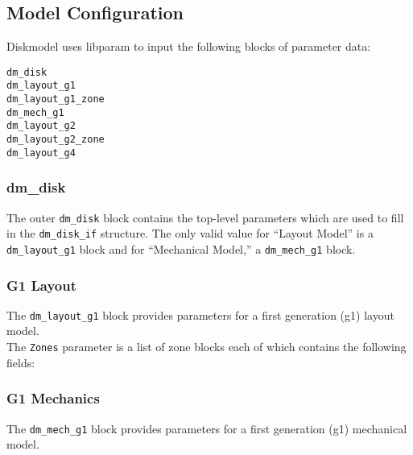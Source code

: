 
\subsection{Model Configuration}
Diskmodel uses libparam to input the following blocks of parameter data:

\begin{verbatim}
dm_disk
dm_layout_g1
dm_layout_g1_zone
dm_mech_g1
dm_layout_g2
dm_layout_g2_zone
dm_layout_g4
\end{verbatim}

\subsubsection{dm\_disk}

The outer \texttt{dm\_disk} block contains the top-level parameters
which are used to fill in the \texttt{dm\_disk\_if} structure.  The
only valid value for ``Layout Model'' is a \texttt{dm\_layout\_g1}
block and for ``Mechanical Model,'' a \texttt{dm\_mech\_g1} block.\\



\subsubsection{G1 Layout}

The \texttt{dm\_layout\_g1} block provides parameters for a first
generation (g1) layout model.\\



The \texttt{Zones} parameter is a list of zone blocks each of which
contains the following fields:\\



\subsubsection{G1 Mechanics}

The \texttt{dm\_mech\_g1} block provides parameters for a first
generation (g1) mechanical model.\\

